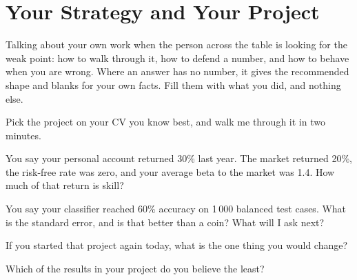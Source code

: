 \chapter{Your Strategy and Your Project}\label{ch:iv2:your-strategy-and-your-project}

\begin{ivtrains}
Talking about your own work when the person across the table is looking for the weak point: how to walk through it, how to defend a number, and how to behave when you are wrong. Where an answer has no number, it gives the recommended shape and blanks for your own facts. Fill them with what you did, and nothing else.
\end{ivtrains}

\begin{question}\label{iq:iv2:your-strategy-and-your-project:1}
Pick the project on your CV you know best, and walk me through it in two minutes.
\end{question}

\begin{question}\label{iq:iv2:your-strategy-and-your-project:2}
You say your personal account returned 30\% last year. The market returned 20\%, the risk-free rate was zero, and your average beta to the market was 1.4. How much of that return is skill?
\end{question}

\begin{question}\label{iq:iv2:your-strategy-and-your-project:3}
You say your classifier reached 60\% accuracy on 1\,000 balanced test cases. What is the standard error, and is that better than a coin? What will I ask next?
\end{question}

\begin{question}\label{iq:iv2:your-strategy-and-your-project:4}
If you started that project again today, what is the one thing you would change?
\end{question}

\begin{question}\label{iq:iv2:your-strategy-and-your-project:5}
Which of the results in your project do you believe the least?
\end{question}

